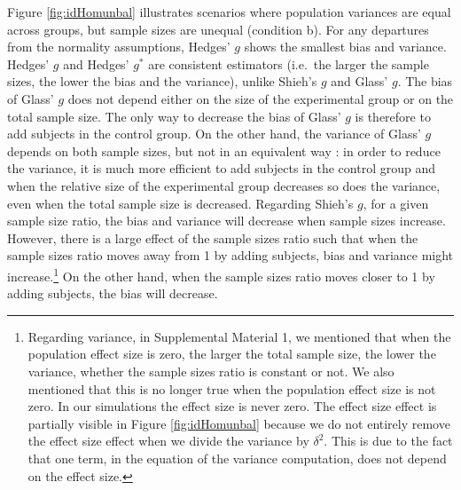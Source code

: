 \documentclass[
  english,
  man,floatsintext]{apa6}
\begin{document}
Figure \ref{fig:idHomunbal} illustrates scenarios where population variances are equal across groups, but sample sizes are unequal (condition b). For any departures from the normality assumptions, Hedges' \(g\) shows the smallest bias and variance. Hedges' \(g\) and Hedges' \(g^*\) are consistent estimators (i.e.~the larger the sample sizes, the lower the bias and the variance), unlike Shieh's \(g\) and Glass' \(g\). The bias of Glass' \(g\) does not depend either on the size of the experimental group or on the total sample size. The only way to decrease the bias of Glass' \(g\) is therefore to add subjects in the control group. On the other hand, the variance of Glass' \(g\) depends on both sample sizes, but not in an equivalent way : in order to reduce the variance, it is much more efficient to add subjects in the control group and when the relative size of the experimental group decreases so does the variance, even when the total sample size is decreased. Regarding Shieh's \(g\), for a given sample size ratio, the bias and variance will decrease when sample sizes increase. However, there is a large effect of the sample sizes ratio such that when the sample sizes ratio moves away from 1 by adding subjects, bias and variance might increase.\footnote{Regarding variance, in Supplemental Material 1, we mentioned that when the population effect size is zero, the larger the total sample size, the lower the variance, whether the sample sizes ratio is constant or not. We also mentioned that this is no longer true when the population effect size is not zero. In our simulations the effect size is never zero. The effect size effect is partially visible in Figure \ref{fig:idHomunbal} because we do not entirely remove the effect size effect when we divide the variance by $\delta^2$. This is due to the fact that one term, in the equation of the variance computation, does not depend on the effect size.} On the other hand, when the sample sizes ratio moves closer to 1 by adding subjects, the bias will decrease.
\end{document}

